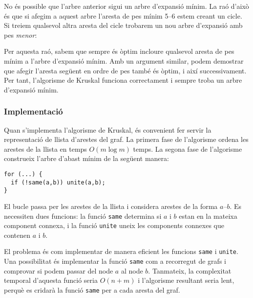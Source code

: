 No és possible que l'arbre anterior sigui un arbre d'expansió
mínim.  La raó d'això és que si afegim a aquest arbre l'aresta de pes
mínim 5--6 estem creant un cicle. Si treiem qualsevol altra
aresta del cicle trobarem un nou arbre d'expansió amb pes
\emph{menor}:


\begin{center}
\end{center}


Per aquesta raó, sabem que sempre és òptim incloure qualsevol aresta
de pes mínim a l'arbre d'expansió mínim. Amb un argument similar,
podem demostrar que afegir l'aresta següent en ordre de pes també és
òptim, i així successivament. Per tant, l'algorisme de Kruskal
funciona correctament i sempre troba un arbre d'expansió mínim.

\subsubsection{Implementació}

Quan s'implementa l'algorisme de Kruskal, és convenient fer servir la
representació de llista d'arestes del graf. La primera fase de
l'algorisme ordena les arestes de la llista en temps $O(m \log m)$
temps. La segona fase de l'algorisme construeix l'arbre d'abast mínim
de la següent manera:


\begin{lstlisting}
for (...) {
  if (!same(a,b)) unite(a,b);
}
\end{lstlisting}


El bucle passa per les arestes de la llista i considera arestes de la
forma $a$--$b$. Es necessiten dues funcions: la funció \texttt{same}
determina si $a$ i $b$ estan en la mateixa component connexa, i la
funció \texttt{unite} uneix les components connexes que contenen $a$ i
$b$.

El problema és com implementar de manera eficient les funcions
\texttt{same} i \texttt{unite}. Una possibilitat és implementar la
funció \texttt{same} com a recorregut de grafs i comprovar si podem
passar del node $a$ al node $b$. Tanmateix, la complexitat temporal
d'aquesta funció seria $O(n+m)$ i l'algorisme resultant seria lent,
perquè es cridarà la funció \texttt{same} per a cada aresta del
graf.

